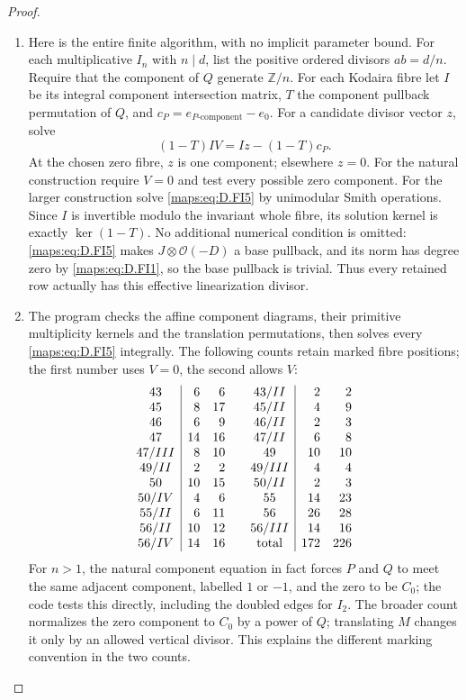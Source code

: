 \begin{proof}
\begin{enumerate}[label=\arabic*.,leftmargin=*]
\item Here is the entire finite algorithm, with no implicit parameter
bound. For each multiplicative $I_n$ with $n\mid d$, list the
positive ordered divisors $ab=d/n$. Require that the component
of $Q$ generate $\mathbb Z/n$. For each Kodaira fibre let $I$ be
its integral component intersection matrix, $T$ the component
pullback permutation of $Q$, and $c_P=e_{P\text{-component}}-e_0$.
For a candidate divisor vector $z$, solve
\[
              (1-T)I V=Iz-(1-T)c_P.                         \tag{D.FI5}\label{maps:eq:D.FI5}
\]
At the chosen zero fibre, $z$ is one component; elsewhere $z=0$.
For the natural construction require $V=0$ and test every possible
zero component. For the larger construction solve \eqref{maps:eq:D.FI5} by
unimodular Smith operations. Since $I$ is invertible modulo the
invariant whole fibre, its solution kernel is exactly $\ker(1-T)$.
No additional numerical condition is omitted: \eqref{maps:eq:D.FI5} makes
$J\otimes\mathcal O(-D)$ a base pullback, and its norm has degree
zero by \eqref{maps:eq:D.FI1}, so the base pullback is trivial. Thus every retained
row actually has this effective linearization divisor.

\item The program checks the affine component diagrams, their primitive
multiplicity kernels and the translation permutations, then solves
every \eqref{maps:eq:D.FI5} integrally. The following counts retain marked fibre
positions; the first number uses $V=0$, the second allows $V$:
\[
\begin{array}{c|rr@{\qquad}c|rr}
43&6&6&43/II&2&2\\
45&8&17&45/II&4&9\\
46&6&9&46/II&2&3\\
47&14&16&47/II&6&8\\
47/III&8&10&49&10&10\\
49/II&2&2&49/III&4&4\\
50&10&15&50/II&2&3\\
50/IV&4&6&55&14&23\\
55/II&6&11&56&26&28\\
56/II&10&12&56/III&14&16\\
56/IV&14&16&\text{total}&172&226
\end{array}
\]
For $n>1$, the natural component equation in fact forces
$P$ and $Q$ to meet the same adjacent component, labelled $1$ or
$-1$, and the zero to be $C_0$; the code tests this directly,
including the doubled edges for $I_2$. The broader count normalizes
the zero component to $C_0$ by a power of $Q$; translating $M$
changes it only by an allowed vertical divisor. This explains
the different marking convention in the two counts.
\end{enumerate}
\end{proof}

